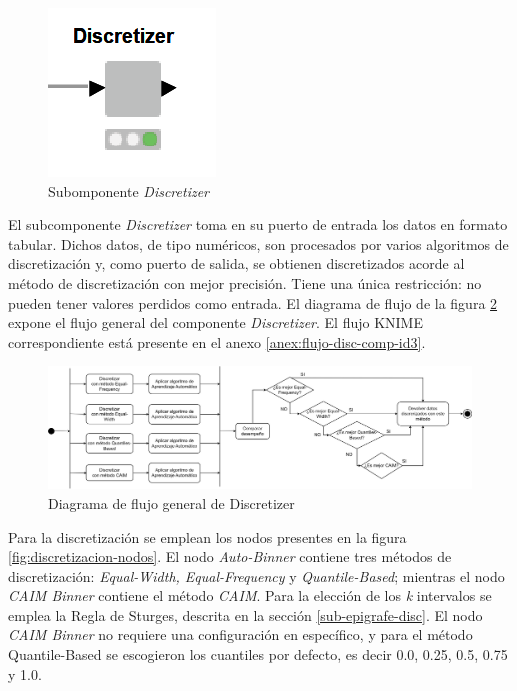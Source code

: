 \begin{figure}[H]
	\centering
	\includegraphics[width=0.15\linewidth]{"figuras/capi 2/subcomp-disc"}
	\caption[Subcomponente Discretizer]{Subomponente \textit{Discretizer}}
	\label{fig:subcomp-disc}
\end{figure}

El subcomponente \textit{Discretizer} toma en su puerto de entrada los datos en formato tabular. Dichos datos, de tipo numéricos, son procesados por varios algoritmos de discretización y, como puerto de salida, se obtienen discretizados acorde al método de discretización con mejor precisión. Tiene una única restricción: no pueden tener valores perdidos como entrada. El diagrama de flujo de la figura \ref{fig:discretizacion} expone el flujo general del componente \textit{Discretizer}. El flujo KNIME correspondiente está presente en el anexo \ref{anex:flujo-disc-comp-id3}.

\begin{figure}[H]
	\centering
	\includegraphics[width=1\linewidth]{"figuras/capi 2/preprocesado/discretizacion.drawio"}
	\caption{Diagrama de flujo general de Discretizer}
	\label{fig:discretizacion}
\end{figure}

Para la discretización se emplean los nodos presentes en la figura \ref{fig:discretizacion-nodos}. El nodo \textit{Auto-Binner} contiene tres métodos de discretización: \textit{Equal-Width, Equal-Frequency} y \textit{Quantile-Based}; mientras el nodo \textit{CAIM Binner} contiene el método \textit{CAIM}. Para la elección de los \textit{k} intervalos se emplea la Regla de Sturges, descrita en la sección \ref{sub-epigrafe-disc}. El nodo \textit{CAIM Binner} no requiere una configuración en específico, y para el método Quantile-Based se escogieron los cuantiles por defecto, es decir 0.0, 0.25, 0.5, 0.75 y 1.0.

